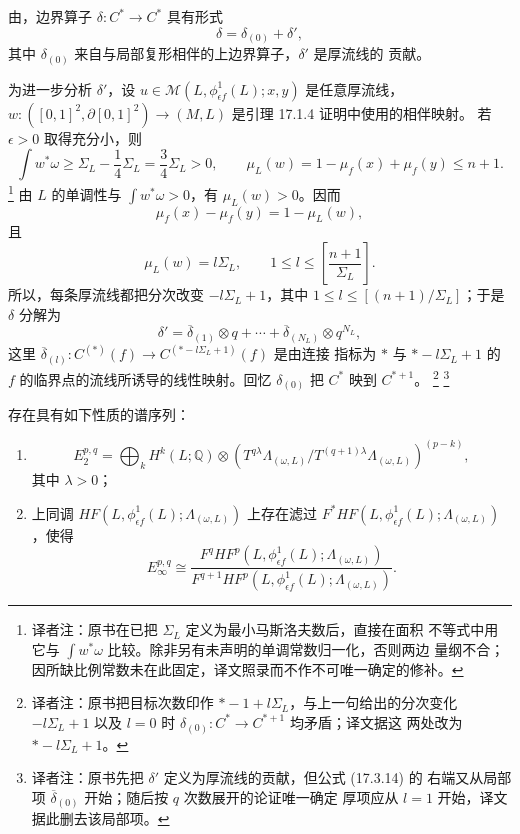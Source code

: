 由\termThickThinDichotomy{}，边界算子 $\delta:C^*\to C^*$ 具有形式
\[
 \delta=\delta_{(0)}+\delta',
\]
其中 $\delta_{(0)}$ 来自与局部\personFloer{}复形相伴的上边界算子，$\delta'$ 是厚流线的
贡献。

为进一步分析 $\delta'$，设
$u\in\mathcal M(L,\phi_{\epsilon f}^1(L);x,y)$ 是任意厚流线，
$w:([0,1]^2,\partial[0,1]^2)\to(M,L)$ 是引理 17.1.4 证明中使用的相伴映射。
若 $\epsilon>0$ 取得充分小，则
\[
 \int w^*\omega\geq\Sigma_L-\frac14\Sigma_L
 =\frac34\Sigma_L>0,
 \qquad
 \mu_L(w)=1-\mu_f(x)+\mu_f(y)\leq n+1.
\]
\footnote{译者注：原书在已把 $\Sigma_L$ 定义为最小马斯洛夫数后，直接在面积
不等式中用它与 $\int w^*\omega$ 比较。除非另有未声明的单调常数归一化，否则两边
量纲不合；因所缺比例常数未在此固定，译文照录而不作不可唯一确定的修补。}
由 $L$ 的单调性与 $\int w^*\omega>0$，有 $\mu_L(w)>0$。因而
\[
 \mu_f(x)-\mu_f(y)=1-\mu_L(w),
\]
且
\[
 \mu_L(w)=l\Sigma_L,
 \qquad 1\leq l\leq\left[\frac{n+1}{\Sigma_L}\right].
\]
所以，每条厚流线都把\personMorse{}分次改变 $-l\Sigma_L+1$，其中
$1\leq l\leq[(n+1)/\Sigma_L]$；于是 $\delta$ 分解为
\begin{equation}
 \delta'=\overline\delta_{(1)}\otimes q
 +\cdots+\overline\delta_{(N_L)}\otimes q^{N_L},
\label{eq:17-delta-prime-decomposition}
\end{equation}
这里 $\overline\delta_{(l)}:C^{(*)}(f)\to C^{(*-l\Sigma_L+1)}(f)$ 是由连接
指标为 $*$ 与 $*-l\Sigma_L+1$ 的 $f$ 的临界点的流线所诱导的线性映射。回忆
$\delta_{(0)}$ 把 $C^*$ 映到 $C^{*+1}$。
\footnote{译者注：原书把目标次数印作 $*-1+l\Sigma_L$，与上一句给出的分次变化
$-l\Sigma_L+1$ 以及 $l=0$ 时 $\delta_{(0)}:C^*\to C^{*+1}$ 均矛盾；译文据这
两处改为 $*-l\Sigma_L+1$。}
\footnote{译者注：原书先把 $\delta'$ 定义为厚流线的贡献，但公式 (17.3.14) 的
右端又从局部项 $\overline\delta_{(0)}$ 开始；随后按 $q$ 次数展开的论证唯一确定
厚项应从 $l=1$ 开始，译文据此删去该局部项。}

\begin{theorem}
\label{thm:lagrangian-spectral-sequence}
存在具有如下性质的谱序列：
\begin{enumerate}[label=(\arabic*)]
\item
\[
 E_2^{p,q}=\bigoplus_k H^k(L;\mathbb Q)\otimes
 \left(T^{q\lambda}\Lambda_{(\omega,L)}
 /T^{(q+1)\lambda}\Lambda_{(\omega,L)}\right)^{(p-k)},
\]
其中 $\lambda>0$；
\item \personFloer{}上同调 $HF(L,\phi_{\epsilon f}^1(L);\Lambda_{(\omega,L)})$ 上存在滤过
$F^*HF(L,\phi_{\epsilon f}^1(L);\Lambda_{(\omega,L)})$，使得
\[
 E_\infty^{p,q}\cong
 \frac{F^qHF^p(L,\phi_{\epsilon f}^1(L);\Lambda_{(\omega,L)})}
 {F^{q+1}HF^p(L,\phi_{\epsilon f}^1(L);\Lambda_{(\omega,L)})}.
\]
\end{enumerate}
\end{theorem}

